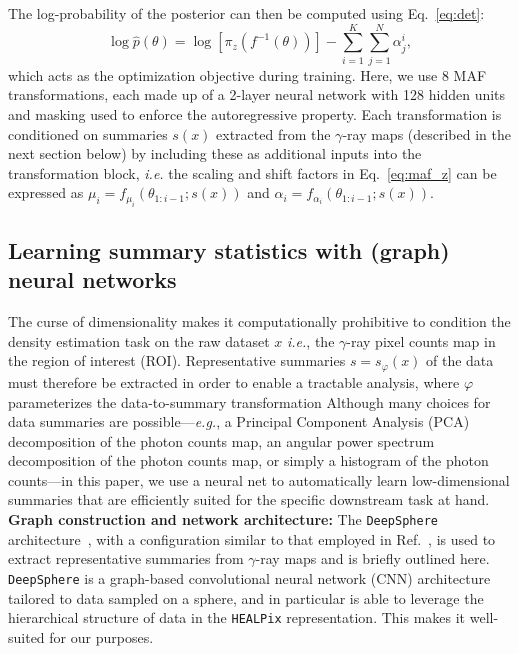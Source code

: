 \documentclass[prd,aps,10pt,nofootinbib,twocolumn,superscriptaddress,preprintnumbers,balancelastpage,longbibliography]{revtex4-1}
\begin{document}
The log-probability of the posterior can then be computed using Eq.~\eqref{eq:det}:
\begin{equation}
\log \hat{p}({\theta}) = \log \left[\pi_{z}\left(f^{-1}({\theta})\right)\right]-\sum_{i=1}^{K} \sum_{j=1}^{N} \alpha_{j}^{i},
\end{equation}
which acts as the optimization objective during training. Here, we use 8 MAF transformations, each made up of a 2-layer neural network with 128 hidden units and masking used to enforce the autoregressive property. Each transformation is conditioned on summaries $s(x)$ extracted from the $\gamma$-ray maps (described in the next section below) by including these as additional inputs into the transformation block, \emph{i.e.} the scaling and shift factors in Eq.~\eqref{eq:maf_z} can be expressed as $\mu_{i}=f_{\mu_{i}}\left({\theta}_{1: i-1} ; {s(x)}\right)$ and $\alpha_i = f_{\alpha_{i}}\left({\theta}_{1: i-1} ; {s(x)}\right)$.

\subsection{Learning summary statistics with (graph) neural networks}

The curse of dimensionality makes it computationally prohibitive to condition the density estimation task on the raw dataset $x$ \emph{i.e.}, the $\gamma$-ray pixel counts map in the region of interest (ROI). Representative summaries $s = s_\varphi(x)$ of the data must therefore be extracted in order to enable a tractable analysis, where $\varphi$ parameterizes the data-to-summary transformation Although many choices for data summaries are possible---\emph{e.g.}, a Principal Component Analysis (PCA) decomposition of the photon counts map, an angular power spectrum decomposition of the photon counts map, or simply a histogram of the photon counts---in this paper, we use a neural net to automatically learn low-dimensional summaries that are efficiently suited for the specific downstream task at hand. \\

\noindent
\textbf{Graph construction and network architecture:}
The \texttt{DeepSphere} architecture~\cite{defferrard2020deepsphere,Perraudin:2018rbt,deepsphere_rlgm}, with a configuration similar to that employed in Ref.~\cite{List:2020mzd}, is used to extract representative summaries from $\gamma$-ray maps and is briefly outlined here. \texttt{DeepSphere} is a graph-based convolutional neural network (CNN) architecture tailored to data sampled on a sphere, and in particular is able to leverage the hierarchical structure of data in the \texttt{HEALPix} representation. This makes it well-suited for our purposes.
\end{document}
